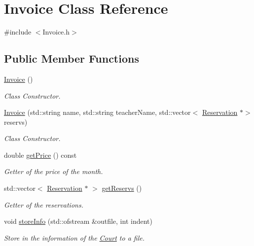 \hypertarget{class_invoice}{}\section{Invoice Class Reference}
\label{class_invoice}


{\ttfamily \#include $<$Invoice.\+h$>$}

\subsection*{Public Member Functions}
\begin{DoxyCompactItemize}
\item 
\mbox{\label{class_invoice_a25d6ad261479340ac3775e21f03eef90}} 
\mbox{\hyperlink{class_invoice_a25d6ad261479340ac3775e21f03eef90}{Invoice}} ()
\begin{DoxyCompactList}\small\item\em Class Constructor. \end{DoxyCompactList}\item 
\mbox{\hyperlink{class_invoice_a332d51ff2cf16d52178fa61ddc69f017}{Invoice}} (std\+::string name, std\+::string teacher\+Name, std\+::vector$<$ \mbox{\hyperlink{class_reservation}{Reservation}} $\ast$$>$ reservs)
\begin{DoxyCompactList}\small\item\em Class Constructor. \end{DoxyCompactList}\item 
double \mbox{\hyperlink{class_invoice_a049d93832eedd6c40a0b5a686771bdb6}{get\+Price}} () const
\begin{DoxyCompactList}\small\item\em Getter of the price of the month. \end{DoxyCompactList}\item 
std\+::vector$<$ \mbox{\hyperlink{class_reservation}{Reservation}} $\ast$ $>$ \mbox{\hyperlink{class_invoice_a98ede540a39d22c91a3bc6c5b28116fd}{get\+Reservs}} ()
\begin{DoxyCompactList}\small\item\em Getter of the reservations. \end{DoxyCompactList}\item 
void \mbox{\hyperlink{class_invoice_a326f9548d517f1f432939e0c8231a84e}{store\+Info}} (std\+::ofstream \&outfile, int indent)
\begin{DoxyCompactList}\small\item\em Store in the information of the \mbox{\hyperlink{class_court}{Court}} to a file. \end{DoxyCompactList}\item 
$$
\end{DoxyCompactItemize}
